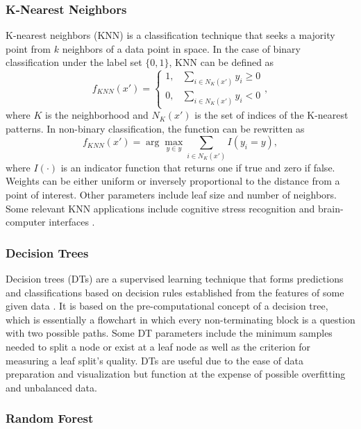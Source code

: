 \documentclass[12pt]{uthesis-v12}  %
\begin{document}
\subsubsection{K-Nearest Neighbors}

K-nearest neighbors (KNN) is a classification technique that seeks a majority point from $k$ neighbors of a data point in space. In the case of binary classification under the label set $\{0,1\}$, KNN can be defined as \cite{kramer2}
\begin{equation}
f_{KNN}(x') = \begin{cases}
	1, & \sum_{i \in N_K(x')} y_i \geq 0 \\
	0, & \sum_{i \in N_K(x')} y_i < 0
	\end{cases},
\end{equation}
where $K$ is the neighborhood and $N_K(x')$ is the set of indices of the K-nearest patterns. In non-binary classification, the function can be rewritten as
\begin{equation}
f_{KNN}(x') = \arg\max_{y \in y} \sum_{i \in N_K(x')} I(y_i = y),
\end{equation}
where $I(\cdot)$ is an indicator function that returns one if true and zero if false. Weights can be either uniform or inversely proportional to the distance from a point of interest. Other parameters include leaf size and number of neighbors. Some relevant KNN applications include cognitive stress recognition \cite{calibo} and brain-computer interfaces \cite{girouard}.

\subsubsection{Decision Trees}

Decision trees (DTs) are a supervised learning technique that forms predictions and classifications based on decision rules established from the features of some given data \cite{breiman}. It is based on the pre-computational concept of a decision tree, which is essentially a flowchart in which every non-terminating block is a question with two possible paths. Some DT parameters include the minimum samples needed to split a node or exist at a leaf node as well as the criterion for measuring a leaf split's quality. DTs are useful due to the ease of data preparation and visualization but function at the expense of possible overfitting and unbalanced data. 

\subsubsection{Random Forest}
\end{document}
